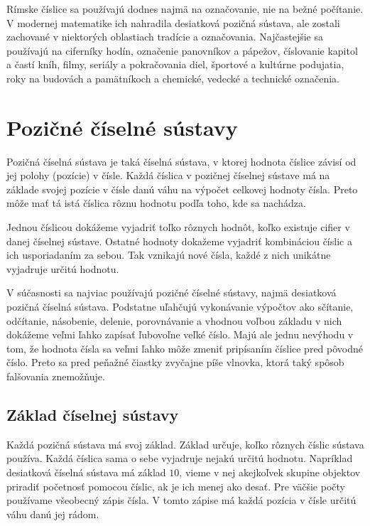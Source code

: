 \documentclass{report}
\begin{document}
Rímske číslice sa používajú dodnes najmä na označovanie, nie na bežné počítanie. V modernej matematike ich nahradila desiatková pozičná sústava, ale zostali zachované v niektorých oblastiach tradície a označovania. Najčastejšie sa používajú na ciferníky hodín, označenie panovníkov a pápežov, číslovanie kapitol a častí kníh, filmy, seriály a pokračovania diel, športové a kultúrne podujatia, roky na budovách a pamätníkoch a chemické, vedecké a technické označenia.

\section{Pozičné číselné sústavy}

Pozičná číselná sústava je taká číselná sústava, v ktorej hodnota číslice závisí od jej polohy (pozície) v čísle. Každá číslica v pozičnej číselnej sústave má na základe svojej pozície v čísle danú váhu na výpočet celkovej hodnoty čísla. Preto môže mať tá istá číslica rôznu hodnotu podľa toho, kde sa nachádza.

Jednou číslicou dokážeme vyjadriť toľko rôznych hodnôt, koľko existuje cifier v danej číselnej sústave. Ostatné hodnoty dokažeme vyjadriť kombináciou číslic a ich usporiadaním za sebou. Tak vznikajú nové čísla, každé z nich unikátne vyjadruje určitú hodnotu.

V súčasnosti sa najviac používajú pozičné číselné sústavy, najmä desiatková pozičná číselná sústava. Podstatne uľahčujú vykonávanie výpočtov ako sčítanie, odčítanie, násobenie, delenie, porovnávanie a vhodnou voľbou základu v nich dokážeme veľmi ľahko zapísať ľubovoľne veľké číslo. Majú ale jednu nevýhodu v tom, že hodnota čísla sa veľmi ľahko môže zmeniť pripísaním číslice pred pôvodné číslo. Preto sa pred peňažné čiastky zvyčajne píše vlnovka, ktorá taký spôsob falšovania znemožňuje.

\subsection{Základ číselnej sústavy}

Každá pozičná sústava má svoj základ. Základ určuje, koľko rôznych číslic sústava používa. Každá číslica sama o sebe vyjadruje nejakú určitú hodnotu. Napríklad desiatková číselná sústava má základ \(10\), vieme v nej akejkoľvek skupine objektov priradiť početnosť pomocou číslic, ak je ich menej ako desať. Pre väčšie počty používame všeobecný zápis čísla. V tomto zápise má každá pozícia v čísle určitú váhu danú jej rádom.
\end{document}

